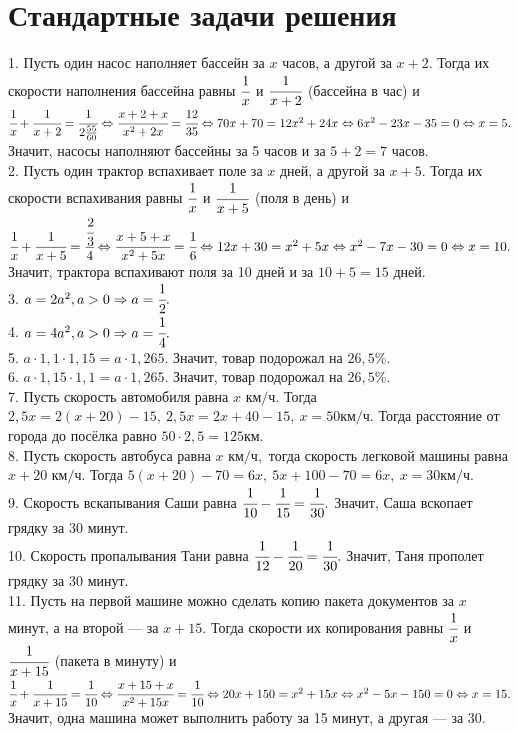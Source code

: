 \documentclass[12pt]{article}
\begin{document}
\section{Стандартные задачи решения}
1. Пусть один насос наполняет бассейн за $x$ часов, а другой за $x+2.$ Тогда их скорости наполнения бассейна равны $\cfrac{1}{x}$ и $\cfrac{1}{x+2}$ (бассейна в час) и $\cfrac{1}{x}+\cfrac{1}{x+2}=\cfrac{1}{2\frac{55}{60}}\Leftrightarrow \cfrac{x+2+x}{x^2+2x}=\cfrac{12}{35}\Leftrightarrow
70x+70=12x^2+24x\Leftrightarrow6x^2-23x-35=0\Leftrightarrow x=5.$ Значит, насосы наполняют бассейны за 5 часов и за $5+2=7$ часов.\\
2. Пусть один трактор вспахивает поле за $x$ дней, а другой за $x+5.$ Тогда их скорости вспахивания равны $\cfrac{1}{x}$ и $\cfrac{1}{x+5}$ (поля в день) и $\cfrac{1}{x}+\cfrac{1}{x+5}=\cfrac{\cfrac{2}{3}}{4}\Leftrightarrow \cfrac{x+5+x}{x^2+5x}=\cfrac{1}{6}\Leftrightarrow
12x+30=x^2+5x\Leftrightarrow x^2-7x-30=0\Leftrightarrow x=10.$ Значит, трактора вспахивают поля за 10 дней и за $10+5=15$ дней.\\
3. $a=2a^2, a>0\Rightarrow a=\cfrac{1}{2}.$\\
4. $a=4a^2, a>0\Rightarrow a=\cfrac{1}{4}.$\\
5. $a\cdot1,1\cdot1,15=a\cdot1,265.$ Значит, товар подорожал на $26,5\%.$\\
6. $a\cdot1,15\cdot1,1=a\cdot1,265.$ Значит, товар подорожал на $26,5\%.$\\
7. Пусть скорость автомобиля равна $x\text{ км/ч}.$ Тогда $2,5x=2(x+20)-15,\ 2,5x=2x+40-15,\ x=50\text{км/ч}.$ Тогда расстояние от города до посёлка равно $50\cdot2,5=125$км.\\
8. Пусть скорость автобуса равна $x\text{ км/ч},$ тогда скорость легковой машины равна $x+20\text{ км/ч}.$ Тогда $5(x+20)-70=6x,\ 5x+100-70=6x,\ x=30\text{км/ч}.$\\
9. Скорость вскапывания Саши равна $\cfrac{1}{10}-\cfrac{1}{15}=\cfrac{1}{30}.$ Значит, Саша вскопает грядку за 30 минут.\\
10. Скорость пропалывания Тани равна $\cfrac{1}{12}-\cfrac{1}{20}=\cfrac{1}{30}.$ Значит, Таня прополет грядку за 30 минут.\\
11. Пусть на первой машине можно сделать копию пакета документов за $x$ минут, а на второй --- за $x+15.$ Тогда скорости их копирования равны $\cfrac{1}{x}$ и
$\cfrac{1}{x+15}$ (пакета в минуту) и $\cfrac{1}{x}+\cfrac{1}{x+15}=\cfrac{1}{10}\Leftrightarrow\cfrac{x+15+x}{x^2+15x}=\cfrac{1}{10}\Leftrightarrow
20x+150=x^2+15x\Leftrightarrow x^2-5x-150=0\Leftrightarrow x=15.$ Значит, одна машина может выполнить работу за 15 минут, а другая --- за 30.\\
\end{document}
